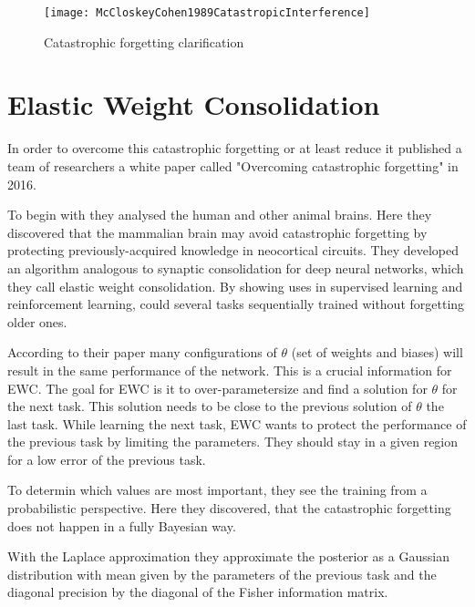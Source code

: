 \begin{figure}[H]
    \centering
    \texttt{[image: McCloskeyCohen1989CatastropicInterference]}
    \caption{\cite[page 148]{psychology_learning_mccloskey_cohen} Catastrophic forgetting clarification}
    \label{fig:catastrophic_forgetting_clarification}
\end{figure}

\section{Elastic Weight Consolidation}

In order to overcome this catastrophic forgetting or at least reduce it published a team of researchers a white paper called "Overcoming catastrophic forgetting" in 2016.
\cite{elastic-weight-consolidation}

To begin with they analysed the human and other animal brains.
Here they discovered that the mammalian brain may avoid catastrophic forgetting by protecting previously-acquired knowledge in neocortical circuits.
They developed an algorithm analogous to synaptic consolidation for deep neural networks, which they call elastic weight consolidation.
By showing uses in supervised learning and reinforcement learning, could several tasks sequentially trained without forgetting older ones.
\cite{elastic-weight-consolidation}

According to their paper many configurations of $\theta$ (set of weights and biases) will result in the same performance of the network.
This is a crucial information for EWC.
The goal for EWC is it to over-parametersize and find a solution for $\theta$ for the next task.
This solution needs to be close to the previous solution of $\theta$ the last task.
While learning the next task, EWC wants to protect the performance of the previous task by limiting the parameters.
They should stay in a given region for a low error of the previous task.
\cite{elastic-weight-consolidation}

To determin which values are most important, they see the training from a probabilistic perspective.
Here they discovered, that the catastrophic forgetting does not happen in a fully Bayesian way.
\cite{elastic-weight-consolidation}


With the Laplace approximation they approximate the posterior as a Gaussian distribution with mean given by the parameters of the previous task and the diagonal precision by the diagonal of the Fisher information matrix.
\cite{elastic-weight-consolidation}

